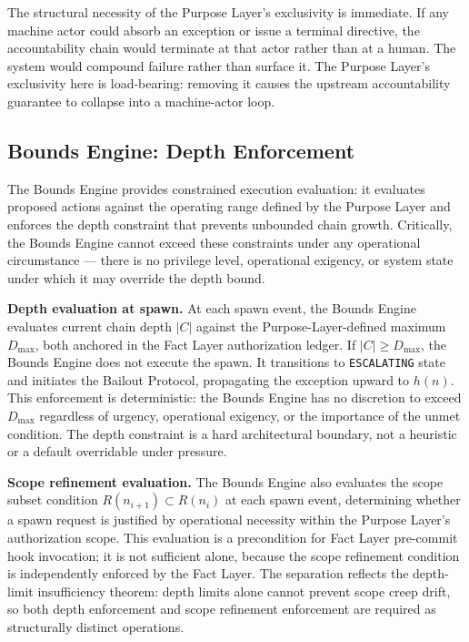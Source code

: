 \medskip
The structural necessity of the Purpose Layer's exclusivity is immediate. If any machine actor could absorb an exception or issue a terminal directive, the accountability chain would terminate at that actor rather than at a human. The system would compound failure rather than surface it. The Purpose Layer's exclusivity here is load-bearing: removing it causes the upstream accountability guarantee to collapse into a machine-actor loop.

\subsection{Bounds Engine: Depth Enforcement}
\label{sec:rs-bounds-depth}

The Bounds Engine provides constrained execution evaluation: it evaluates proposed actions against the operating range defined by the Purpose Layer and enforces the depth constraint that prevents unbounded chain growth. Critically, the Bounds Engine cannot exceed these constraints under any operational circumstance --- there is no privilege level, operational exigency, or system state under which it may override the depth bound.

\medskip
\noindent\textbf{Depth evaluation at spawn.} At each spawn event, the Bounds Engine evaluates current chain depth $|C|$ against the Purpose-Layer-defined maximum $D_{\mathrm{max}}$, both anchored in the Fact Layer authorization ledger. If $|C| \geq D_{\mathrm{max}}$, the Bounds Engine does not execute the spawn. It transitions to \texttt{ESCALATING} state and initiates the Bailout Protocol, propagating the exception upward to $h(n)$. This enforcement is deterministic: the Bounds Engine has no discretion to exceed $D_{\mathrm{max}}$ regardless of urgency, operational exigency, or the importance of the unmet condition. The depth constraint is a hard architectural boundary, not a heuristic or a default overridable under pressure.

\medskip
\noindent\textbf{Scope refinement evaluation.} The Bounds Engine also evaluates the scope subset condition $R(n_{i+1}) \subset R(n_i)$ at each spawn event, determining whether a spawn request is justified by operational necessity within the Purpose Layer's authorization scope. This evaluation is a precondition for Fact Layer pre-commit hook invocation; it is not sufficient alone, because the scope refinement condition is independently enforced by the Fact Layer. The separation reflects the depth-limit insufficiency theorem: depth limits alone cannot prevent scope creep drift, so both depth enforcement and scope refinement enforcement are required as structurally distinct operations.


